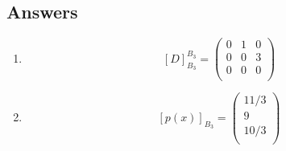 \documentclass{article}
\theoremstyle{problemstyle}
\begin{document}
\subsection*{Answers}

\begin{enumerate}
\item $$[D]^{B_3}_{B_3} = 
\begin{pmatrix} 0 & 1& 0  \\
 0 & 0& 3   \\
  0 & 0& 0   \\
\end{pmatrix}$$

\item $$[p(x)]_{B_3} = \begin{pmatrix} 11/3  \\
 9   \\
  10/3   \\
\end{pmatrix}$$ 
\end{enumerate}
\end{document}
